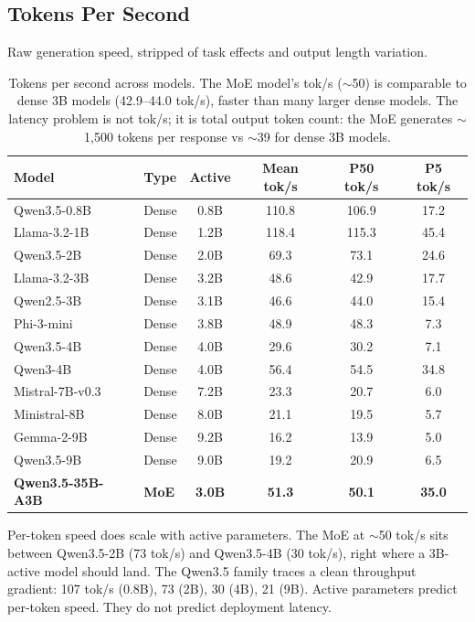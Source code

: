 \documentclass[11pt]{article}
\begin{document}
\subsection{Tokens Per Second}
\label{sec:throughput}

Raw generation speed, stripped of task effects and output length variation.

\begin{table}[t]
\centering
\caption{Tokens per second across models.  The MoE model's tok/s (${\sim}$50) is comparable to dense 3B models (42.9--44.0 tok/s), faster than many larger dense models.  The latency problem is not tok/s; it is total output token count: the MoE generates ${\sim}$1,500 tokens per response vs ${\sim}$39 for dense 3B models.}
\label{tab:throughput}
\small
\begin{tabular}{llcccc}
\toprule
\textbf{Model} & \textbf{Type} & \textbf{Active} & \textbf{Mean tok/s} & \textbf{P50 tok/s} & \textbf{P5 tok/s} \\
\midrule
Qwen3.5-0.8B & Dense & 0.8B & 110.8 & 106.9 & 17.2 \\
Llama-3.2-1B & Dense & 1.2B & 118.4 & 115.3 & 45.4 \\
Qwen3.5-2B & Dense & 2.0B & 69.3 & 73.1 & 24.6 \\
Llama-3.2-3B & Dense & 3.2B & 48.6 & 42.9 & 17.7 \\
Qwen2.5-3B & Dense & 3.1B & 46.6 & 44.0 & 15.4 \\
Phi-3-mini & Dense & 3.8B & 48.9 & 48.3 & 7.3 \\
Qwen3.5-4B & Dense & 4.0B & 29.6 & 30.2 & 7.1 \\
Qwen3-4B & Dense & 4.0B & 56.4 & 54.5 & 34.8 \\
Mistral-7B-v0.3 & Dense & 7.2B & 23.3 & 20.7 & 6.0 \\
Ministral-8B & Dense & 8.0B & 21.1 & 19.5 & 5.7 \\
Gemma-2-9B & Dense & 9.2B & 16.2 & 13.9 & 5.0 \\
Qwen3.5-9B & Dense & 9.0B & 19.2 & 20.9 & 6.5 \\
\midrule
\rowcolor{moepurple!8}
\textbf{Qwen3.5-35B-A3B} & \textbf{MoE} & \textbf{3.0B} & \textbf{51.3} & \textbf{50.1} & \textbf{35.0} \\
\bottomrule
\end{tabular}
\end{table}

Per-token speed does scale with active parameters.  The MoE at ${\sim}$50 tok/s sits between Qwen3.5-2B (73 tok/s) and Qwen3.5-4B (30 tok/s), right where a 3B-active model should land.  The Qwen3.5 family traces a clean throughput gradient: 107 tok/s (0.8B), 73 (2B), 30 (4B), 21 (9B).  Active parameters predict per-token speed.  They do not predict deployment latency.
\end{document}
